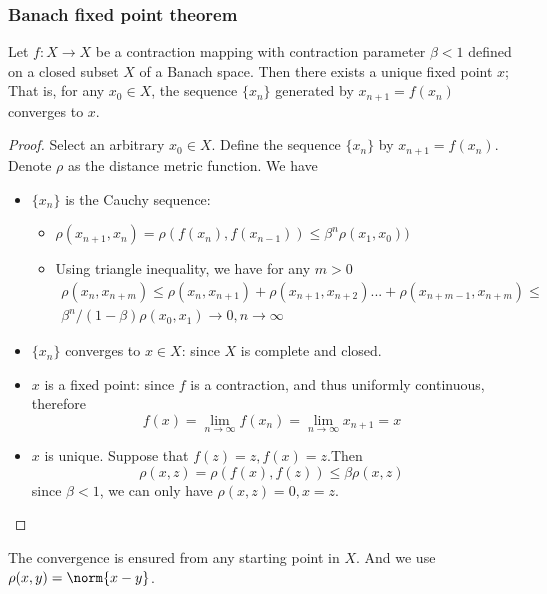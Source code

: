 \begin{refsection}
\subsubsection{Banach fixed point theorem}
\begin{theorem}\label{ch:functional-analysis:th:BanachFixedPointTheorem}
	\cite{carter2001foundations}\cite[122]{griffel2002applied}\cite[771]{bertsekas2016nonlinear}Let $f: X\rightarrow X$ be a contraction mapping with contraction parameter $\beta < 1$ defined on a closed subset $X$ of a Banach space. Then there exists a unique fixed point $x$; That is, for any $x_0 \in X$, the sequence $\{x_n\}$ generated by $x_{n+1} = f(x_n)$ converges to $x$.
\end{theorem}
\begin{proof}
	Select an arbitrary $x_0 \in X$. Define the sequence $\{x_n\}$ by $x_{n+1} = f(x_{n})$. Denote $\rho$ as the distance metric function. We have
	\begin{itemize}
		\item $\{x_n\}$ is the Cauchy sequence:
		\begin{itemize}
			\item $\rho(x_{n+1},x_n) = \rho(f(x_n),f(x_{n-1})) \leq \beta^n\rho(x_1,x_0))$
			\item Using triangle inequality, we have for any $m > 0$
			\begin{align*}
			\rho(x_n,x_{n+m}) \leq \rho(x_n,x_{n+1}) + \rho(x_{n+1},x_{n+2})... + \rho(x_{n+m-1},x_{n+m}) \leq \\ \beta^n/(1-\beta)\rho(x_0,x_1) \rightarrow 0, n\rightarrow \infty   
			\end{align*}
			
		\end{itemize}
		\item $\{x_n\}$ converges to $x \in X$: since $X$ is complete and closed.
		\item $x$ is a fixed point: since $f$ is a contraction, and thus uniformly continuous, therefore
		$$f(x) = \lim_{n\rightarrow \infty} f(x_{n}) = \lim_{n\rightarrow \infty }x_{n+1} = x$$
		\item $x$ is unique. Suppose that $f(z)=z,f(x)=z$.Then
		$$\rho(x,z) = \rho(f(x),f(z)) \leq \beta \rho(x,z)$$
		since $\beta < 1$, we can only have $\rho(x,z)=0,x=z$.
	\end{itemize}	
\end{proof}


\begin{remark}
	The convergence is ensured from any starting point in $X$. And we use $\rho(x,y) = \norm{x-y}$.
\end{remark}




\end{refsection}
